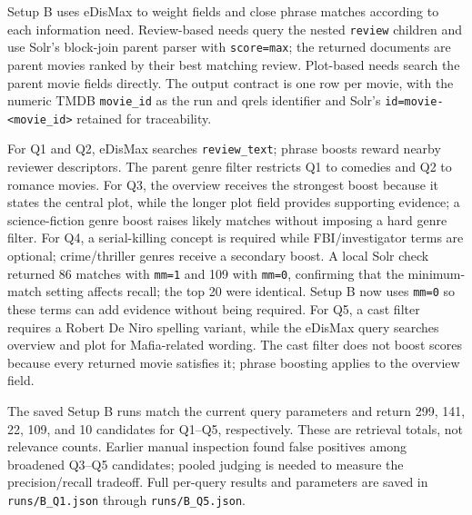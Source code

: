 \documentclass[sigconf]{acmart}
\begin{document}
Setup B uses eDisMax to weight fields and close phrase matches according to each
information need. Review-based needs query the nested \texttt{review} children and
use Solr's block-join parent parser with \texttt{score=max}; the returned documents
are parent movies ranked by their best matching review. Plot-based needs search the
parent movie fields directly. The output contract is one row per movie, with the
numeric TMDB \texttt{movie\_id} as the run and qrels identifier and Solr's
\texttt{id=movie-<movie\_id>} retained for traceability.

For Q1 and Q2, eDisMax searches \texttt{review\_text}; phrase boosts reward nearby
reviewer descriptors. The parent genre filter restricts Q1 to comedies and Q2 to
romance movies. For Q3, the overview receives the strongest boost because it states
the central plot, while the longer plot field provides supporting evidence; a
science-fiction genre boost raises likely matches without imposing a hard genre
filter. For Q4, a serial-killing concept is required while FBI/investigator terms
are optional; crime/thriller genres receive a secondary boost. A local Solr check
returned 86 matches with \texttt{mm=1} and 109 with \texttt{mm=0}, confirming that
the minimum-match setting affects recall; the top 20 were identical. Setup B now
uses \texttt{mm=0} so these terms can add evidence without being required. For Q5,
a cast filter requires a Robert De Niro spelling variant, while
the eDisMax query searches overview and plot for Mafia-related wording. The cast
filter does not boost scores because every returned movie satisfies it; phrase
boosting applies to the overview field.

The saved Setup B runs match the current query parameters and return 299, 141, 22,
109, and 10 candidates for Q1--Q5, respectively. These are retrieval totals, not
relevance counts. Earlier manual inspection found false positives among broadened
Q3--Q5 candidates; pooled judging is needed to measure the precision/recall tradeoff.
Full per-query results and parameters are saved in
\texttt{runs/B\_Q1.json} through \texttt{runs/B\_Q5.json}.
\end{document}
